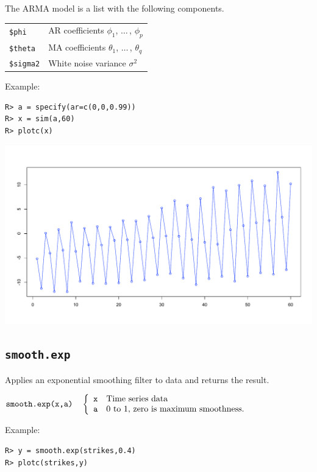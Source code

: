 \documentclass[12pt]{article}
\begin{document}
%
\bigskip
\noindent
The ARMA model is a list with the following components.

\begin{center}
\begin{tabular}{ll}
{\tt \$phi} & AR coefficients $\phi_1$, $\ldots\,$, $\phi_p$\\
{\tt \$theta} & MA coefficients $\theta_1$, $\ldots\,$, $\theta_q$\\
{\tt \$sigma2} & White noise variance $\sigma^2$
\end{tabular}
\end{center}

\noindent
Example:
\begin{verbatim}
R> a = specify(ar=c(0,0,0.99))
R> x = sim(a,60)
R> plotc(x)
\end{verbatim}

\begin{center}
\includegraphics[scale=0.3]{Rplot-24.pdf}
\end{center}

\newpage

\subsection{\tt smooth.exp}
Applies an exponential smoothing filter to data and returns the result.

\bigskip
$
\hbox{\tt smooth.exp(x,a)}\quad\left\{\begin{array}{ll}
{\tt x} & \hbox{Time series data}\\
{\tt a} & \hbox{0 to 1, zero is maximum smoothness.}
\end{array}\right.
$

\bigskip
\noindent
Example:

\begin{verbatim}
R> y = smooth.exp(strikes,0.4)
R> plotc(strikes,y)
\end{verbatim}
\end{document}
